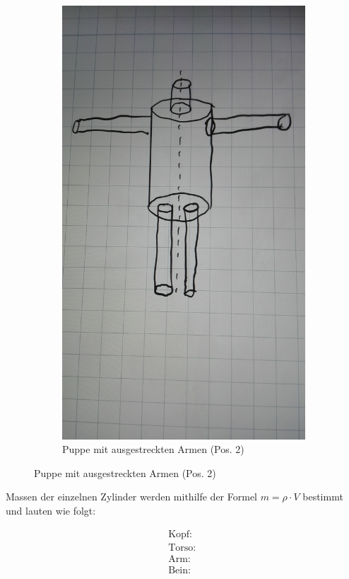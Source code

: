 \begin{figure}[H]
\begin{subfigure}{0.495\linewidth}
        \includegraphics[width=\textwidth]{images/puppe_aus.jpg}
        \caption{Puppe mit ausgestreckten Armen (Pos. 2)}
        \label{fig:2b}
    \end{subfigure}
\end{figure}
\justifying Massen der einzelnen Zylinder werden mithilfe der Formel $m= \rho \cdot V$ bestimmt und lauten wie folgt:

\begin{subequations}
\begin{align}
\text{Kopf: }\label{eq:21a}\\
\text{Torso: }\label{eq:21b}\\
\text{Arm: }\label{eq:21c}\\
\text{Bein: }\label{eq:21d}
\end{align}
\end{subequations}

